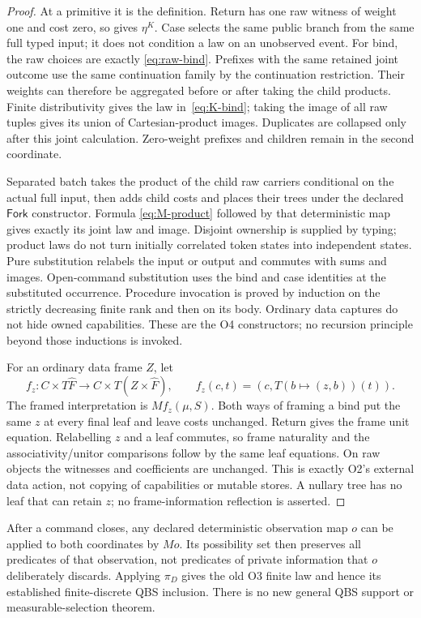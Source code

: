 \documentclass[11pt,a4paper]{article}
\theoremstyle{definition}
\begin{document}
\begin{proof}
At a primitive it is the definition. Return has one raw witness of
weight one and cost zero, so gives $\eta^K$. Case selects the same public
branch from the same full typed input; it does not condition a law on an
unobserved event. For bind, the raw choices are exactly
\eqref{eq:raw-bind}. Prefixes with the same retained joint outcome use
the same continuation family by the continuation restriction. Their
weights can therefore be aggregated before or after taking the child
products. Finite distributivity gives the law in~\eqref{eq:K-bind};
taking the image of all raw tuples gives its union of Cartesian-product
images. Duplicates are collapsed only after this joint calculation.
Zero-weight prefixes and children remain in the second coordinate.

Separated batch takes the product of the child raw carriers conditional
on the actual full input, then adds child costs and places their trees
under the declared $\mathsf{Fork}$ constructor. Formula
\eqref{eq:M-product} followed by that deterministic map gives exactly
its joint law and image. Disjoint ownership is supplied by typing;
product laws do not turn initially correlated token states into
independent states. Pure substitution relabels the input or output and
commutes with sums and images. Open-command substitution uses the bind
and case identities at the substituted occurrence. Procedure invocation
is proved by induction on the strictly decreasing finite rank and then
on its body. Ordinary data captures do not hide owned capabilities.
These are the O4 constructors; no recursion principle beyond those
inductions is invoked.

For an ordinary data frame $Z$, let
\[
 f_z:C\times T\widehat F\longrightarrow C\times T(Z\times\widehat F),
 \qquad f_z(c,t)=(c,T(b\mapsto(z,b))(t)).
\]
The framed interpretation is $M f_z(\mu,S)$. Both ways of framing a
bind put the same $z$ at every final leaf and leave costs unchanged.
Return gives the frame unit equation. Relabelling $z$ and a leaf commutes,
so frame naturality and the associativity/unitor comparisons follow by
the same leaf equations. On raw objects the witnesses and coefficients
are unchanged. This is exactly O2's external data action, not copying of
capabilities or mutable stores. A nullary tree has no leaf that can retain
$z$; no frame-information reflection is asserted.
\end{proof}
After a command closes, any declared deterministic observation map $o$
can be applied to both coordinates by $Mo$. Its possibility set then
preserves all predicates of that observation, not predicates of private
information that $o$ deliberately discards. Applying $\pi_D$ gives the
old O3 finite law and hence its established finite-discrete QBS inclusion.
There is no new general QBS support or measurable-selection theorem.
\end{document}
